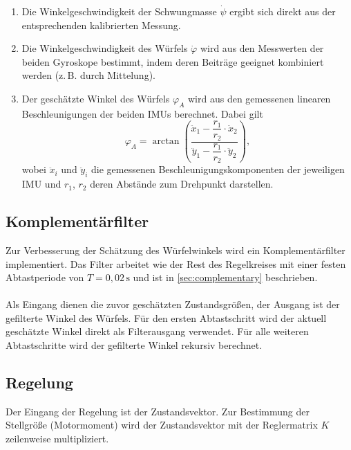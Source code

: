             \begin{enumerate}
                \item Die Winkelgeschwindigkeit der Schwungmasse $\dot{\psi}$ ergibt sich direkt aus der entsprechenden kalibrierten Messung.

                \item Die Winkelgeschwindigkeit des Würfels $\dot{\varphi}$ wird aus den Messwerten der beiden Gyroskope bestimmt, indem deren Beiträge geeignet kombiniert werden (z.\,B. durch Mittelung).

                \item Der geschätzte Winkel des Würfels $\varphi_A$ wird aus den gemessenen linearen Beschleunigungen der beiden IMUs berechnet. Dabei gilt
                \[
                    \varphi_A = \arctan\!\left(
                    \frac{\ddot{x}_1 - \dfrac{r_1}{r_2}\cdot \ddot{x}_2}
                        {\ddot{y}_1 - \dfrac{r_1}{r_2}\cdot \ddot{y}_2}
                    \right),
                \]
                wobei $\ddot{x}_i$ und $\ddot{y}_i$ die gemessenen Beschleunigungskomponenten der jeweiligen IMU und $r_1$, $r_2$ deren Abstände zum Drehpunkt darstellen.
            \end{enumerate}

        \subsection{Komplementärfilter}
            Zur Verbesserung der Schätzung des Würfelwinkels wird ein Komplementärfilter implementiert. Das Filter arbeitet wie der Rest des Regelkreises mit einer festen Abtastperiode von $T = 0{,}02\,\mathrm{s}$ und ist in \autoref{sec:complementary} beschrieben.\\
            \\
            Als Eingang dienen die zuvor geschätzten Zustandsgrößen, der Ausgang ist der gefilterte Winkel des Würfels. Für den ersten Abtastschritt wird der aktuell geschätzte Winkel direkt als Filterausgang verwendet. Für alle weiteren Abtastschritte wird der gefilterte Winkel rekursiv berechnet.
            
        \subsection{Regelung}
            Der Eingang der Regelung ist der Zustandsvektor. Zur Bestimmung der Stellgröße (Motormoment) wird der Zustandsvektor mit der Reglermatrix $K$ zeilenweise multipliziert.